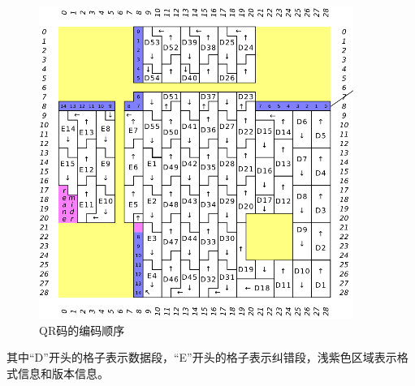 \begin{figure}[h]
\centering
\includegraphics[width=0.9\linewidth]{encoding1}
\caption[encoding]{QR码的编码顺序}
\label{fig:encoding1}
\end{figure}

其中“D”开头的格子表示数据段，“E”开头的格子表示纠错段，浅紫色区域表示格式信息和版本信息。
